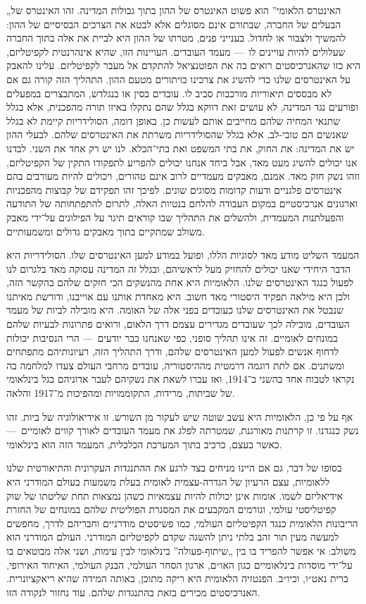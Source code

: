 „האינטרס הלאומי” הוא פשוט האינטרס של ההון בתוך גבולות המדינה. זהו האינטרס של הבעלים של החברה, שבתורם אינם מסוגלים אלא לבטא את הצרכים הבסיסיים של ההון: להמשיך ולצבור או לחדול. בענייני פנים, מטרתו של ההון היא לביית את אלה בתוך החברה שעלולים להיות עויינים לו~— מעמד העובדים. העויינות הזו, שהיא אינהרנטית לקפיטליזם, היא כזו שהאנרכיסטים רואים בה את הפוטנציאל להתקדם אל מעבר לקפיטליזם. עלינו להאבק על האינטרסים שלנו כדי להשיג את צרכינו כויתורים מטעם ההון. התהליך הזה קורה גם אם לא מבססים תיאוריות מורכבות סביב לו. עובדים בסין או בנגלדש, המתבצרים במפעלים ופורעים נגד המדינה, לא עושים זאת דווקא בגלל שהם נתקלו באיזו תורה מהפכנית, אלא בגלל שתנאי המחיה שלהם מחייבים אותם לעשות כן. באופן דומה, הסולידריות קיימת לא בגלל שאנשים הם טובי-לב, אלא בגלל שהסולידריות משרתת את האינטרסים שלהם. לבעלי ההון יש את המדינה: את החוק, את בתי המשפט ואת בתי־הכלא. לנו יש רק אחד את השני. לבדנו אנו יכולים להשיג מעט מאד, אבל ביחד אנחנו יכולים להפריע לתפקודו התקין של הקפיטליזם, וזהו נשק חזק מאד. אמנם, מאבקים מעמדיים לרוב אינם טהורים, ויכולים להיות מעורבים בהם אינטרסים פלגניים ודעות קדומות מסוגים שונים. לפיכך זהו תפקידם של קבוצות מהפכניות וארגונים אנרכיסטיים במקום העבודה להלחם בנטיות האלה, לתרום להתפתחותה של התודעה והפעלתנות המעמדית, ולהשלים את התהליך שבו קוראים תיגר על הפילוגים על־ידי מאבק משולב שמתקיים בתוך מאבקים גדולים ומשמעותיים.

המעמד השליט מודע מאד לסוגיות הללו, ופועל במודע למען האינטרסים שלו. הסולידריות היא הדבר היחידי שאנו יכולים להחזיק מעל לראשיהם, ובגלל זה המדינה עסוקה מאד בלגרום לנו לפעול כנגד האינטרסים שלנו. הלאומיות היא אחת מהנשקים הכי חזקים שלהם בהקשר הזה, ולכן היא מילאה תפקיד היסטורי מאד חשוב. היא מאחדת אותנו עם אוייבנו, ודורשת מאיתנו שנבטל את האינטרסים שלנו כעובדים בפני אלה של האומה. היא מובילה לביות של מעמד העובדים, מובילה לכך שעובדים מגדירים עצמם דרך הלאום, ורואים פתרונות לבעיות שלהם במונחים לאומיים. זה אינו תהליך סופני, כפי שאנחנו כבר יודעים~— הרי הנסיבות יכולות לדחוף אנשים לפעול למען האינטרסים שלהם, ודרך התהליך הזה, רעיונותיהם מתפתחים ומשתנים. אם לתת דוגמה דרמטית מההיסטוריה, עובדים מרחבי העולם צעדו למלחמה בה נקראו לטבוח אחד בהשני ב־1914, ואז עברו לשאת את נשקיהם לעבר אדוניהם בגל בינלאומי של שביתות, מרידות, התקוממויות ומהפיכות מ־1917 והלאה.

אף על פי כן, הלאומיות היא עשב שוטה שיש לעקור מן השורש. זו אידיאולוגיה של ביות. זהו נשק כנגדנו. זו קרתנות מאורגנת, שמטרתה לפלג את מעמד העובדים לאורך קווים לאומיים~— כאשר בעצם, כרכיב בתוך המערכת הכלכלית, המעמד הזה הוא בינלאומי.

בסופו של דבר, גם אם היינו מניחים בצד לרגע את ההתנגדות העקרונית והתיאורטית שלנו ללאומיות, עצם הרעיון של הגדרה-עצמית לאומית בעלת משמעות בעולם המודרני היא אידיאליזם לשמו. אומות אינן יכולות להיות עצמאיות כשהן נמצאות תחת שליטתו של שוק קפיטליסטי עולמי, וגורמים המקבעים את המסגרת הפוליטית שלהם במונחים של החזרת הריבונות הלאומית כנגד הקפיטליזם העולמי, כמו פשיסטים מודרניים וחבריהם לדרך, מחפשים למעשה מעין תור זהב בלתי ניתן להשגה שקדם לקפיטליזם המודרני. העולם המודרני הוא משולב: אי אפשר להפריד בו בין „שיתוף-פעולה” בינלאומי לבין עימות, ושני אלה מבוטאים בו על־ידי מוסדות בינלאומיים כגון האו״ם, ארגון הסחר העולמי, הבנק העולמי, האיחוד האירופי, ברית נאט״ו, וכיו״ב. הפנטזיה הלאומית היא ריקה מתוכן, באותה המידה שהיא ריאקציונרית. האנרכיסטים מכירים בזאת בהתנגדות שלהם. עוד נחזור לנקודה הזו.


